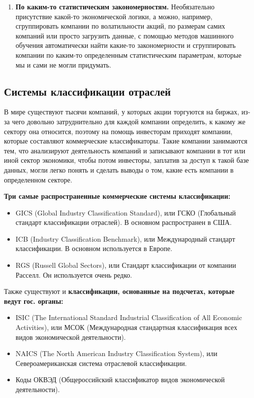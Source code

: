 \documentclass{article}
\begin{document}
\begin{enumerate}
		
		
		\item \textbf{По каким-то статистическим закономерностям.} Необязательно присутствие какой-то экономической логики, а можно, например, сгруппировать компании по волатильности акций, по размерам самих компаний или просто загрузить данные, с помощью методов машинного обучения автоматически найти какие-то закономерности и сгруппировать компании по каким-то определенным статистическим параметрам, которые мы и сами не могли придумать.
		
	\end{enumerate}
	
	\subsection{Системы классификации отраслей}
	
	В мире существуют тысячи компаний, у которых акции торгуются на биржах, из-за чего довольно затруднительно для каждой компании определить, к какому же сектору она относится, поэтому на помощь инвесторам приходят компании, которые составляют коммерческие классификаторы. Такие компании занимаются тем, что анализируют деятельность компаний и записывают компании в тот или иной сектор экономики, чтобы потом инвесторы, заплатив за доступ к такой базе данных, могли легко понять и сделать выводы о том, какие есть компании в определенном секторе.
	
	\textbf{Три самые распространенные коммерческие системы классификации:}
	\begin{itemize}
		\item GICS (Global Industry Classification Standard), или ГСКО (Глобальный стандарт классификации отраслей). В основном распространен в США.
		\item ICB (Industry Classification Benchmark), или Международный стандарт классификации. В основном используется в Европе.
		\item RGS (Russell Global Sectors), или Стандарт классификации от компании Расселл. Он используется очень редко.
	\end{itemize}
	
	
	Также существуют и \textbf{классификации, основанные на подсчетах, которые ведут гос. органы:}
	\begin{itemize}
		\item ISIC (The International Standard Industrial Classification of All Economic Activities), или МСОК (Международная стандартная классификация всех видов экономической деятельности).
		\item NAICS (The North American Industry Classification System), или Североамериканская система отраслевой классификации.
		\item Коды ОКВЭД (Общероссийский классификатор видов экономической деятельности).
	\end{itemize}
	
\end{document}
